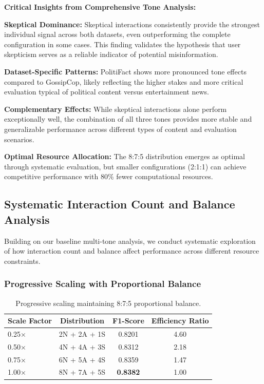 \textbf{Critical Insights from Comprehensive Tone Analysis:}

\textbf{Skeptical Dominance:} Skeptical interactions consistently provide the strongest individual signal across both datasets, even outperforming the complete configuration in some cases. This finding validates the hypothesis that user skepticism serves as a reliable indicator of potential misinformation.

\textbf{Dataset-Specific Patterns:} PolitiFact shows more pronounced tone effects compared to GossipCop, likely reflecting the higher stakes and more critical evaluation typical of political content versus entertainment news.

\textbf{Complementary Effects:} While skeptical interactions alone perform exceptionally well, the combination of all three tones provides more stable and generalizable performance across different types of content and evaluation scenarios.

\textbf{Optimal Resource Allocation:} The 8:7:5 distribution emerges as optimal through systematic evaluation, but smaller configurations (2:1:1) can achieve competitive performance with 80\% fewer computational resources.

\subsection{Systematic Interaction Count and Balance Analysis}

Building on our baseline multi-tone analysis, we conduct systematic exploration of how interaction count and balance affect performance across different resource constraints.

\subsubsection{Progressive Scaling with Proportional Balance}

\begin{table}[htbp]
\centering
\caption{Progressive scaling maintaining 8:7:5 proportional balance.}
\label{tab:proportional_scaling}
\begin{tabular}{lccc}
\toprule
\textbf{Scale Factor} & \textbf{Distribution} & \textbf{F1-Score} & \textbf{Efficiency Ratio} \\
\midrule
0.25× & 2N + 2A + 1S & 0.8201 & 4.60 \\
0.50× & 4N + 4A + 3S & 0.8312 & 2.18 \\
0.75× & 6N + 5A + 4S & 0.8359 & 1.47 \\
1.00× & 8N + 7A + 5S & \textbf{0.8382} & 1.00 \\
\bottomrule
\end{tabular}
\end{table}

